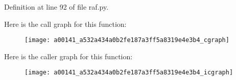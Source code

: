 Definition at line 92 of file raf.\-py.



Here is the call graph for this function\-:
\nopagebreak
\begin{figure}[H]
\begin{center}
\leavevmode
\texttt{[image: a00141\_a532a434a0b2fe187a3ff5a8319e4e3b4\_cgraph]}
\end{center}
\end{figure}




Here is the caller graph for this function\-:
\nopagebreak
\begin{figure}[H]
\begin{center}
\leavevmode
\texttt{[image: a00141\_a532a434a0b2fe187a3ff5a8319e4e3b4\_icgraph]}
\end{center}
\end{figure}


